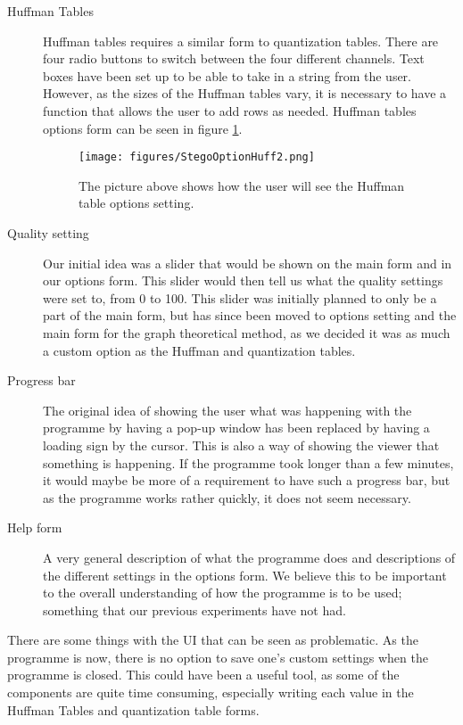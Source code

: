 \begin{description}
\item[Huffman Tables]

Huffman tables requires a similar form to quantization tables. There are four radio buttons to switch between the four different channels. Text boxes have been set up to be able to take in a string from the user. However, as the sizes of the Huffman tables vary, it is necessary to have a function that allows the user to add rows as needed. Huffman tables options form can be seen in figure \ref{fig:StegoOptionHuff2}.


\begin{figure}
	\centering
	\texttt{[image: figures/StegoOptionHuff2.png]}
	\caption{The picture above shows how the user will see the Huffman table options setting.}
	\label{fig:StegoOptionHuff2}
\end{figure}

\item[Quality setting]
Our initial idea was a slider that would be shown on the main form and in our options form.
This slider would then tell us what the quality settings were set to, from 0 to 100.
This slider was initially planned to only be a part of the main form, but has since been moved to options setting and the main form for the graph theoretical method, as we decided it was as much a custom option as the Huffman and quantization tables.

\item[Progress bar]
The original idea of showing the user what was happening with the programme by having a pop-up window has been replaced by having a loading sign by the cursor.
This is also a way of showing the viewer that something is happening.
If the programme took longer than a few minutes, it would maybe be more of a requirement to have such a progress bar, but as the programme works rather quickly, it does not seem necessary.

\item[Help form]
A very general description of what the programme does and descriptions of the different settings in the options form.
We believe this to be important to the overall understanding of how the programme is to be used; something that our previous experiments have not had.
\end{description}

There are some things with the UI that can be seen as problematic.
As the programme is now, there is no option to save one's custom settings when the programme is closed.
This could have been a useful tool, as some of the components are quite time consuming, especially writing each value in the Huffman Tables and quantization table forms.

